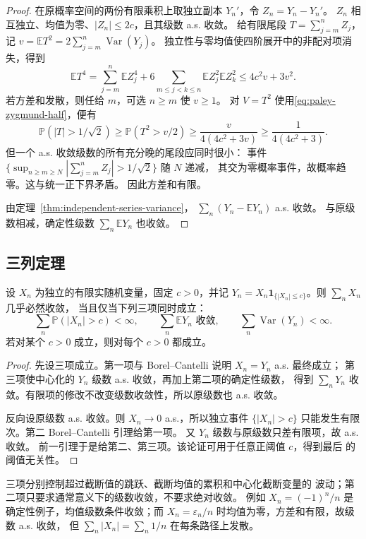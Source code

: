 \begin{proof}
在原概率空间的两份有限乘积上取独立副本 $Y_n'$，令 $Z_n=Y_n-Y_n'$。
$Z_n$ 相互独立、均值为零、$|Z_n|\le2c$，且其级数 a.s. 收敛。
给有限尾段 $T=\sum_{j=m}^nZ_j$，记
$v=\mathbb E T^2=2\sum_{j=m}^n\operatorname{Var}(Y_j)$。
独立性与零均值使四阶展开中的非配对项消失，得到
\[
 \mathbb E T^4
 =\sum_{j=m}^n\mathbb E Z_j^4
   +6\sum_{m\le j<k\le n}\mathbb E Z_j^2\mathbb E Z_k^2
 \le4c^2v+3v^2.
\]
若方差和发散，则任给 $m$，可选 $n\ge m$ 使 $v\ge1$。
对 $V=T^2$ 使用\eqref{eq:paley-zygmund-half}，便有
\[
 \mathbb P(|T|>1/\sqrt2)
 \ge\mathbb P(T^2>v/2)
 \ge\frac{v}{4(4c^2+3v)}\ge\frac1{4(4c^2+3)}.
\]
但一个 a.s. 收敛级数的所有充分晚的尾段应同时很小：
事件 $\{\sup_{n\ge m\ge N}|\sum_{j=m}^nZ_j|>1/\sqrt2\}$ 随 $N$ 递减，
其交为零概率事件，故概率趋零。这与统一正下界矛盾。
因此方差和有限。

由定理~\ref{thm:independent-series-variance}，
$\sum_n(Y_n-\mathbb E Y_n)$ a.s. 收敛。
与原级数相减，确定性级数 $\sum_n\mathbb E Y_n$ 也收敛。
\end{proof}

\subsection{三列定理}

\begin{theorem}
\label{thm:kolmogorov-three-series}
设 $X_n$ 为独立的有限实随机变量，固定 $c>0$，并记
$Y_n=X_n\mathbf1_{\{|X_n|\le c\}}$。则 $\sum_nX_n$ 几乎必然收敛，
当且仅当下列三项同时成立：
\[
 \sum_n\mathbb P(|X_n|>c)<\infty,\qquad
 \sum_n\mathbb E Y_n\text{ 收敛},\qquad
 \sum_n\operatorname{Var}(Y_n)<\infty.
\]
若对某个 $c>0$ 成立，则对每个 $c>0$ 都成立。
\end{theorem}

\begin{proof}
先设三项成立。第一项与 Borel--Cantelli 说明 $X_n=Y_n$ a.s. 最终成立；
第三项使中心化的 $Y_n$ 级数 a.s. 收敛，再加上第二项的确定性级数，
得到 $\sum_nY_n$ 收敛。有限项的修改不改变级数收敛性，所以原级数也
a.s. 收敛。

反向设原级数 a.s. 收敛。则 $X_n\to0$ a.s.，所以独立事件
$\{|X_n|>c\}$ 只能发生有限次。第二 Borel--Cantelli 引理给第一项。
又 $Y_n$ 级数与原级数只差有限项，故 a.s. 收敛。
前一引理于是给第二、第三项。该论证可用于任意正阈值 $c$，得到最后
的阈值无关性。
\end{proof}

三项分别控制超过截断值的跳跃、截断均值的累积和中心化截断变量的
波动；第二项只要求通常意义下的级数收敛，不要求绝对收敛。
例如 $X_n=(-1)^n/n$ 是确定性例子，均值级数条件收敛；而
$X_n=\varepsilon_n/n$ 时均值为零，方差和有限，故级数 a.s. 收敛，
但 $\sum_n|X_n|=\sum_n1/n$ 在每条路径上发散。

